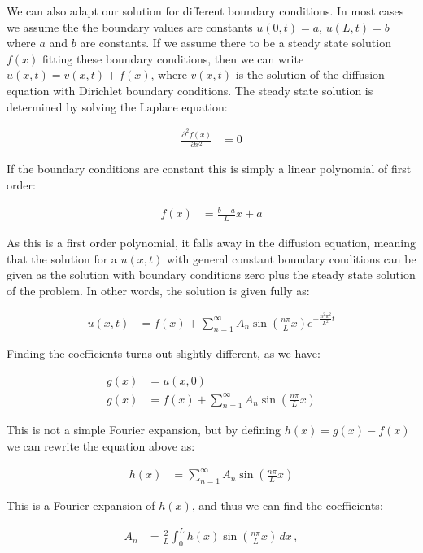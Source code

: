\documentclass[reprint,english,notitlepage]{revtex4-1}  %
\begin{document}
We can also adapt our solution for different boundary conditions. In most cases we assume the the boundary values are constants $u(0,t) = a$, $u(L,t) = b$ where $a$ and $b$ are constants. If we assume there to be a steady state solution $f(x)$ fitting these boundary conditions, then we can write $u(x,t) = v(x,t) + f(x)$, where $v(x,t)$ is the solution of the diffusion equation with Dirichlet boundary conditions. The steady state solution is determined by solving the Laplace equation:

\begin{align*}
\frac{\partial^2 f(x)}{\partial x^2} &= 0 
\end{align*}

If the boundary conditions are constant this is simply a linear polynomial of first order:

\begin{align*}
f(x) &= \frac{b-a}{L} x + a
\end{align*}

As this is a first order polynomial, it falls away in the diffusion equation, meaning that the solution for a $u(x,t)$ with general constant boundary conditions can be given as the solution with boundary conditions zero plus the steady state solution of the problem. In other words, the solution is given fully as:

\begin{align*}
u(x,t) &= f(x) + \sum\limits_{n=1}^\infty A_n \sin( \frac{n\pi}{L} x) e^{-\frac{n^2 \pi^2}{L^2} t}
\end{align*}

Finding the coefficients turns out slightly different, as we have:

\begin{align*}
g(x) &= u(x,0) \\
g(x) &= f(x) + \sum\limits_{n=1}^\infty A_n \sin( \frac{n\pi}{L} x)
\end{align*}

This is not a simple Fourier expansion, but by defining $h(x) = g(x) - f(x)$ we can rewrite the equation above as:

\begin{align*}
h(x) &= \sum\limits_{n=1}^\infty A_n \sin( \frac{n\pi}{L} x)
\end{align*}

This is a Fourier expansion of $h(x)$, and thus we can find the coefficients:

\begin{align*}
A_n &= \frac{2}{L} \int_0^L h(x) \sin (\frac{n\pi}{L} x) \, dx \, ,
\end{align*}
\end{document}
